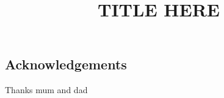 \documentclass[a4paper,11pt,twoside]{report}
\title{TITLE HERE}
\author{}
\begin{document}
\maketitle


\begin{center}
\section*{Acknowledgements}
Thanks mum and dad 
\end{center}

\clearpage

\end{document}
